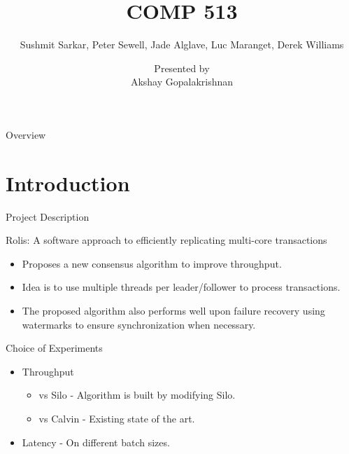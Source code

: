 \documentclass[notes, xcolor=dvipsnames]{beamer}
\title{COMP 513}
\subtitle{Sushmit Sarkar, Peter Sewell, Jade Alglave, Luc Maranget, Derek Williams}
\author{Presented by \\ Akshay Gopalakrishnan}
\begin{document}
    \begin{frame}

        \maketitle

    \end{frame}


    \begin{frame}{Overview}

        \tableofcontents
        
    \end{frame}


    \section{Introduction}

    \begin{frame}{Project Description}


        \begin{center}
            Rolis: A software approach to efficiently replicating multi-core transactions 
        \end{center}

        \begin{itemize}
            \item Proposes a new consensus algorithm to improve throughput. 
            \item Idea is to use multiple threads per leader/follower to process transactions. 
            \item The proposed algorithm also performs well upon failure recovery using watermarks to ensure synchronization when necessary.
        \end{itemize}

    \end{frame}

    \begin{frame}{Choice of Experiments}

        \begin{itemize}
            \item Throughput
            \begin{itemize}
                \item vs Silo - Algorithm is built by modifying Silo.  
                \item vs Calvin - Existing state of the art. 
            \end{itemize}    
            \item Latency - On different batch sizes.           
        \end{itemize}

        
    \end{frame}
\end{document}
